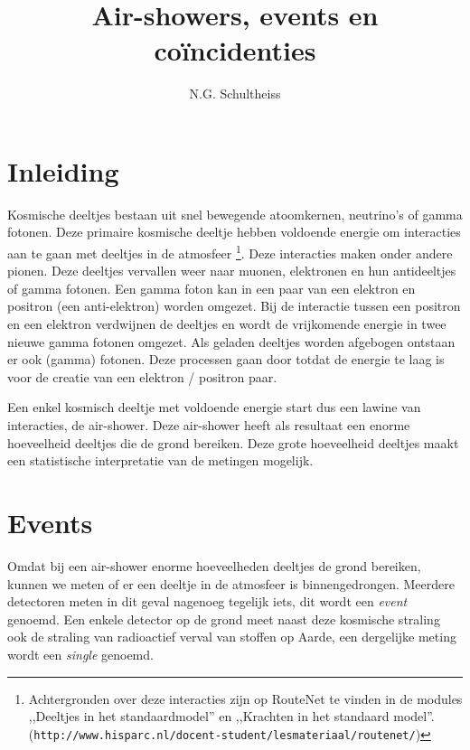 



\title{Air-showers, events en coïncidenties}


\author{N.G. Schultheiss}

\maketitle

\section{Inleiding}

Kosmische deeltjes bestaan uit snel bewegende atoomkernen, neutrino's
of gamma fotonen. Deze primaire kosmische deeltje hebben voldoende
energie om interacties aan te gaan met deeltjes in de atmosfeer%
\footnote{Achtergronden over deze interacties zijn op RouteNet te vinden in
de modules ,,Deeltjes in het standaardmodel'' en ,,Krachten in
het standaard model''. (\texttt{\footnotesize{http://www.hisparc.nl/docent-student/lesmateriaal/routenet/}})%
}. Deze interacties maken onder andere pionen. Deze deeltjes vervallen
weer naar muonen, elektronen en hun antideeltjes of gamma fotonen.
Een gamma foton kan in een paar van een elektron en positron (een
anti-elektron) worden omgezet. Bij de interactie tussen een positron
en een elektron verdwijnen de deeltjes en wordt de vrijkomende energie
in twee nieuwe gamma fotonen omgezet. Als geladen deeltjes worden
afgebogen ontstaan er ook (gamma) fotonen. Deze processen gaan door
totdat de energie te laag is voor de creatie van een elektron / positron
paar.

Een enkel kosmisch deeltje met voldoende energie start dus een lawine
van interacties, de air-shower. Deze air-shower heeft als resultaat
een enorme hoeveelheid deeltjes die de grond bereiken. Deze grote
hoeveelheid deeltjes maakt een statistische interpretatie van de metingen
mogelijk.


\section{Events}

Omdat bij een air-shower enorme hoeveelheden deeltjes de grond bereiken,
kunnen we meten of er een deeltje in de atmosfeer is binnengedrongen.
Meerdere detectoren meten in dit geval nagenoeg tegelijk iets, dit
wordt een \textit{event} genoemd. Een enkele detector op de grond
meet naast deze kosmische straling ook de straling van radioactief
verval van stoffen op Aarde, een dergelijke meting wordt een \textit{single}
genoemd. 

